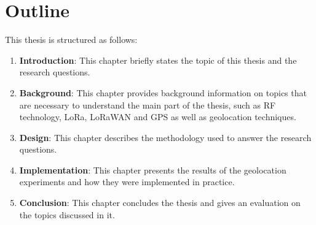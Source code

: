 \section{Outline}

This thesis is structured as follows:

\begin{enumerate}
    \item \textbf{Introduction}:
          This chapter briefly states the topic of this thesis and the research questions.
    \item \textbf{Background}:
          This chapter provides background information on topics that are necessary to understand the main part of the thesis, such as \ac{RF} technology, \ac{LoRa}, \ac{LoRaWAN} and \ac{GPS} as well as geolocation techniques.
    \item \textbf{Design}:
          This chapter describes the methodology used to answer the research questions.
    \item \textbf{Implementation}:
          This chapter presents the results of the geolocation experiments and how they were implemented in practice.
    \item \textbf{Conclusion}:
          This chapter concludes the thesis and gives an evaluation on the topics discussed in it.
\end{enumerate}